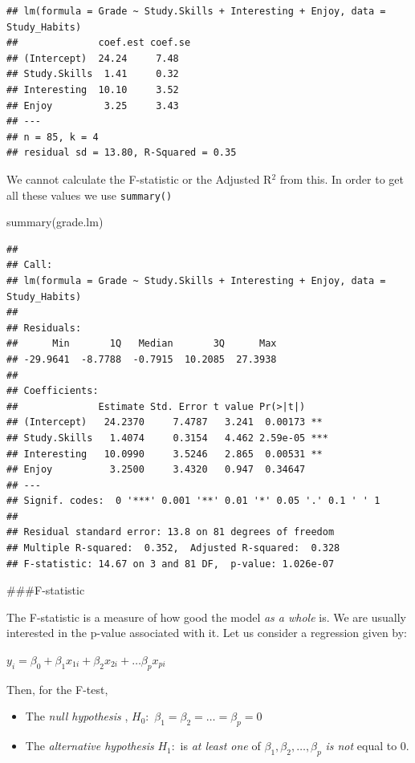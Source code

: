 \documentclass[
]{gitbook}
\newenvironment{Shaded}{\begin{snugshade}}{\end{snugshade}}
\newcommand{\FunctionTok}[1]{\textcolor[rgb]{0.00,0.00,0.00}{#1}}
\newcommand{\NormalTok}[1]{#1}
\providecommand{\tightlist}{%
  \setlength{\itemsep}{0pt}\setlength{\parskip}{0pt}}
\begin{document}
\begin{verbatim}
## lm(formula = Grade ~ Study.Skills + Interesting + Enjoy, data = Study_Habits)
##              coef.est coef.se
## (Intercept)  24.24     7.48  
## Study.Skills  1.41     0.32  
## Interesting  10.10     3.52  
## Enjoy         3.25     3.43  
## ---
## n = 85, k = 4
## residual sd = 13.80, R-Squared = 0.35
\end{verbatim}

We cannot calculate the F-statistic or the Adjusted R\(^2\) from this. In order to get all these values we use \texttt{summary()}

\begin{Shaded}
\begin{Highlighting}[]
\FunctionTok{summary}\NormalTok{(grade.lm)}
\end{Highlighting}
\end{Shaded}

\begin{verbatim}
## 
## Call:
## lm(formula = Grade ~ Study.Skills + Interesting + Enjoy, data = Study_Habits)
## 
## Residuals:
##      Min       1Q   Median       3Q      Max 
## -29.9641  -8.7788  -0.7915  10.2085  27.3938 
## 
## Coefficients:
##              Estimate Std. Error t value Pr(>|t|)    
## (Intercept)   24.2370     7.4787   3.241  0.00173 ** 
## Study.Skills   1.4074     0.3154   4.462 2.59e-05 ***
## Interesting   10.0990     3.5246   2.865  0.00531 ** 
## Enjoy          3.2500     3.4320   0.947  0.34647    
## ---
## Signif. codes:  0 '***' 0.001 '**' 0.01 '*' 0.05 '.' 0.1 ' ' 1
## 
## Residual standard error: 13.8 on 81 degrees of freedom
## Multiple R-squared:  0.352,  Adjusted R-squared:  0.328 
## F-statistic: 14.67 on 3 and 81 DF,  p-value: 1.026e-07
\end{verbatim}

\#\#\#F-statistic

The F-statistic is a measure of how good the model \emph{as a whole} is. We are usually interested in the p-value associated with it. Let us consider a regression given by:

\(y_i = \beta_0+ \beta_1 x_{1i} + \beta_2 x_{2i} + \ldots \beta_p x_{pi}\)

Then, for the F-test,

\begin{itemize}
\tightlist
\item
  The \emph{null hypothesis} , \(H_0: \,\, \beta_1=\beta_2= \ldots =\beta_p=0\)
\item
  The \emph{alternative hypothesis} \(H_1:\) is \emph{at least one} of \(\beta_1,\beta_2, \ldots ,\beta_p\) \emph{is not} equal to 0.
\end{itemize}
\end{document}

